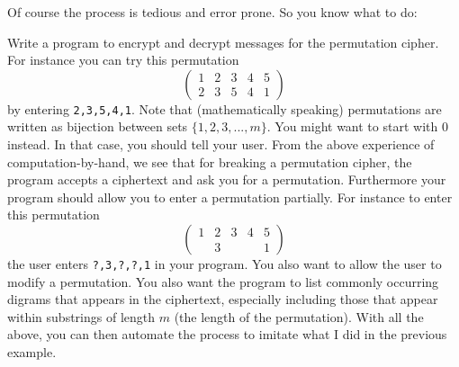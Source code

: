  Of course the process is tedious and error prone.
  So you know what to do:
  \begin{itemize}
    \li Write a program to encrypt and decrypt messages for the
    permutation cipher.
    For instance you can try this permutation
    \[
      \begin{pmatrix}
        1 & 2 & 3 & 4 & 5 \\
        2 & 3 & 5 & 4 & 1
      \end{pmatrix}
    \]
    by entering \verb!2,3,5,4,1!.
    Note that (mathematically speaking) permutations
    are written as bijection between sets $\{1, 2, 3, ..., m\}$.
    You might want to start with $0$ instead.
    In that case, you should tell your user.
    \li 
    From the above experience of computation-by-hand,
    we see that
    for breaking a permutation cipher, the program accepts
    a ciphertext and ask you for a permutation.
    Furthermore your program should allow you to enter a permutation
    partially.
    For instance to enter this permutation
    \[
      \begin{pmatrix}
        1 & 2 & 3 & 4 & 5 \\
        & 3 &   &   & 1
      \end{pmatrix}
    \]
    the user enters \verb!?,3,?,?,1! in your program.
    You also want to allow the user to modify a permutation.
    \li 
    You also want the program to list commonly occurring digrams
    that appears in the ciphertext, especially including those
    that appear within substrings of length $m$ (the length of
    the permutation).
    \li With all the above, you can then automate the process
    to imitate what I did in the previous example.
  \end{itemize}
